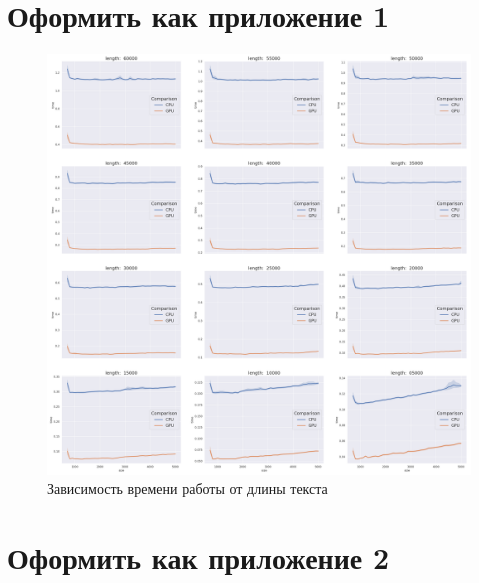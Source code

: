 \newpage
\section*{Оформить как приложение 1}
\label{sec:len}

\begin{figure}[h]
\centering
\includegraphics[width=\textwidth]{img/len_CPU_vs_GPU_Grid}
\caption{\label{fig:len_CPU_vs_GPU_Grid}Зависимость времени работы от длины текста}
\end{figure}

\newpage
\section*{Оформить как приложение 2}
\label{sec:num}

